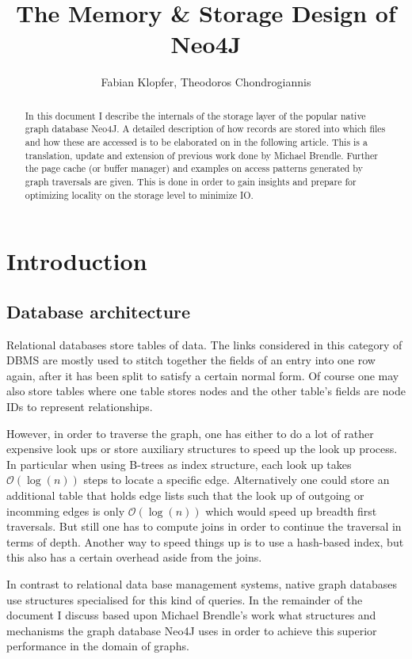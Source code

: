 \documentclass[a4paper,10pt]{article}
\title{The Memory \& Storage Design of Neo4J}
\author{Fabian Klopfer, Theodoros Chondrogiannis}
\begin{document}
\maketitle
\vspace{2cm}

\begin{abstract}
In this document I describe the internals of the storage layer of the popular native graph database Neo4J. A detailed description of how records are stored into which files and how these are accessed is to be elaborated on in the following article. This is a translation, update and extension of previous work done by Michael Brendle. Further the page cache (or buffer manager) and examples on access patterns generated by graph traversals are given. This is done in order to gain insights and prepare for optimizing locality on the storage level to minimize IO.
\end{abstract} \newpage

\tableofcontents \newpage

\section{Introduction}
    \subsection{Database architecture}
        Relational databases store tables of data. The links considered in this category of DBMS are mostly used to stitch together the fields of an entry into one row again, after it has been split to satisfy a certain normal form. Of course one may also store tables where one table stores nodes and the other table's fields are node IDs to represent relationships.

        However, in order to traverse the graph, one has either to do a lot of rather expensive look ups or store auxiliary structures to speed up the look up process. In particular when using B-trees as index structure, each look up takes $\mathcal{O}(\log(n))$ steps to locate a specific edge. Alternatively one could store an additional table that holds edge lists such that the look up of outgoing or incomming edges is only $\mathcal{O}(\log(n))$ which would speed up breadth first traversals. But still one has to compute joins in order to continue the traversal in terms of depth. Another way to speed things up is to use a hash-based index, but this also has a certain overhead aside from the joins.

        In contrast to relational data base management systems, native graph data\-bases use structures specialised for this kind of queries. In the remainder of the document I discuss based upon Michael Brendle's work what structures and mechanisms the graph database Neo4J uses in order to achieve this superior performance in the domain of graphs.
\end{document}
